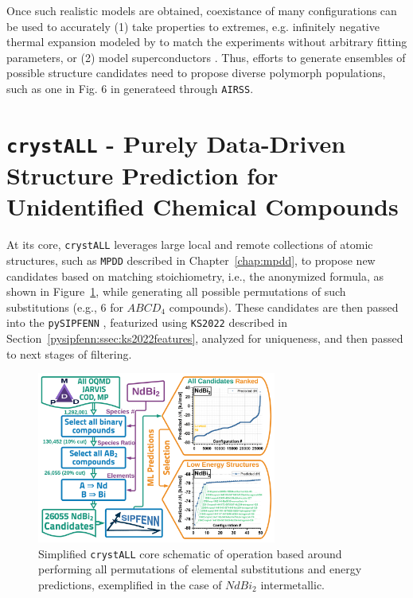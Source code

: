 Once such realistic models are obtained, coexistance of many configurations can be used to accurately (1) take properties to extremes, e.g. infinitely negative thermal expansion modeled by \citet{Liu2022} to match the experiments without arbitrary fitting parameters, or (2) model superconductors \cite{Ferreira2023}. Thus, efforts to generate ensembles of possible structure candidates need to propose diverse polymorph populations, such as one in Fig. 6 in \citet{Pickard2011} generateed through \texttt{AIRSS}.


\section{\texttt{crystALL} - Purely Data-Driven Structure Prediction for Unidentified Chemical Compounds} \label{crystall:sec:crystall}

At its core, \texttt{crystALL} leverages large local and remote collections of atomic structures, such as \texttt{MPDD} described in Chapter~\ref{chap:mpdd}, to propose new candidates based on matching stoichiometry, i.e., the anonymized formula, as shown in Figure~\ref{crystall:fig:crystallcompound}, while generating all possible permutations of such substitutions (e.g., 6 for $ABCD_4$ compounds). These candidates are then passed into the \texttt{pySIPFENN} \citet{Krajewski2024EfficientStructures}, featurized using \texttt{KS2022} described in Section~\ref{pysipfenn:ssec:ks2022features}, analyzed for uniqueness, and then passed to next stages of filtering.

\begin{figure}[H]
    \centering
    \includegraphics[width=0.7\textwidth]{crystall/NdBi2_GraphicalAbstract_V4.png}
    \caption{Simplified \texttt{crystALL} core schematic of operation based around performing all permutations of elemental substitutions and energy predictions, exemplified in the case of $NdBi_2$ intermetallic.}
    \label{crystall:fig:crystallcompound}
\end{figure}

